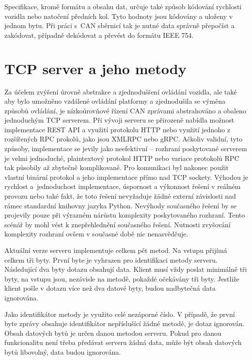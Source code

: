 \documentclass[czech, bachelor]{diploma}
\begin{document}
Specifikace, kromě formátu a obsahu dat, určuje také způsob kódování rychlosti vozidla nebo natočení předních kol. Tyto hodnoty
jsou kódovány a uloženy v jednom bytu. Při práci s~CAN sběrnicí tak je nutné data správně přepočíst a zakódovat, případně
dekódovat a převést do formátu IEEE 754.

\section{TCP server a jeho metody} \label{server-methods}

Za účelem zvýšení úrovně abstrakce a zjednoduššení ovládání vozidla, ale také aby bylo umožněno vzdálené ovládání platformy
a zjednodušila se výměna způsobů ovládání, je nízkoúrovňové řízení CAN zprávami abstrahováno a obaleno jednoduchým TCP serverem.
Při vývoji serveru se přirozeně nabídla možnost implementace REST API a využití protokolu HTTP nebo využití jednoho z rozšířených
RPC prokolů, jako jsou XMLRPC nebo gRPC. Ačkoliv validní, tyto způsoby, implementace se jevily jako neefektivní -- rozhraní
poskytované serverem je velmi jednoduché, plaintextový protokol HTTP nebo variace protokolů RPC tak působily až zbytečně
komplikovaně. Pro komunikaci byl nakonec použit vlastní binární protokol a jeho implementace přímo nad TCP sockety.
Výhodou je rychlost a~jednoduchost implementace, úspornost a výkonnost řešení v reálném provozu nebo také fakt, že toto řešení
nevyžaduje žádné externí závislosti nad rámec standardní knihovny jazyka Python. Nevýhody současného řešení by se projevily
pouze při výrazném nárůstu komplexity poskytovaného rozhraní. Tento scénář by mohl vést k znepřehlednění současného řešení.
Nutnosti zvyšování komplexity rozhraní ovšem v současné době nic nenasvědčuje.

Aktuální verze serveru implementuje celkem pět metod. Na vstupu přijímá celkem tři byty. První byte je vyhrazen pro identifikaci
metody serveru. Následující dva byty dotazu obsahují data. Klient musí vždy poslat minimálně tři byty, na vstupu jsou, nezávisle
na metodě, pokaždé očekávány tři byty. Jestliže klient pošle v dotazu více než dva datové byty, budou nadbytečná data ignorována.

Jako identifikátor metody je využito celé nezáporné číslo. V případě, že první byte zprávy obsahuje identifikátor nepříslušící
žádné metodě, je dotaz ignorován. Obsah datových bytů je určen danou metodou serveru. Pokud pro danou funkcionalitu není třeba
předávat serveru žádná data, může být obsah datových bytů libovolný, data budou ignorována.
\end{document}
